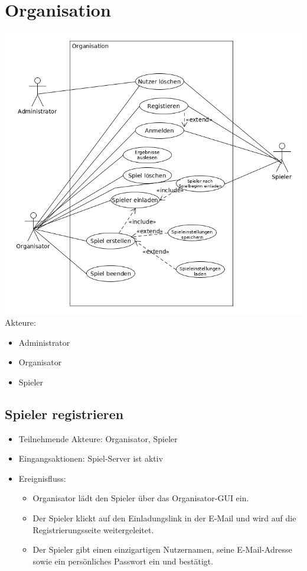 \documentclass[a4paper]{scrreprt}
\begin{document}
    \section{Organisation}
    \includegraphics[width=\textwidth]{uml/export/Organisation.png}
    Akteure:
    \begin{itemize}
        \item \Gls{Administrator}
        \item \Gls{Organisator}
        \item \Gls{Spieler}
    \end{itemize}
    \newpage
   \subsection{Spieler registrieren}
    \begin{itemize}
        \item Teilnehmende Akteure: \Gls{Organisator}, \Gls{Spieler}
        \item Eingangsaktionen: \Gls{Spiel-Server} ist aktiv
        \item Ereignisfluss:
        \begin{itemize}
            \item \Gls{Organisator} lädt den \Gls{Spieler} über das Organisator-GUI ein.
            \item Der \Gls{Spieler} klickt auf den Einladungslink in der E-Mail und wird auf die Registrierungsseite weitergeleitet.
            \item Der \Gls{Spieler} gibt einen einzigartigen Nutzernamen, seine E-Mail-Adresse sowie ein persönliches Passwort ein und bestätigt.
        \end{itemize}
    \end{itemize}
\end{document}
